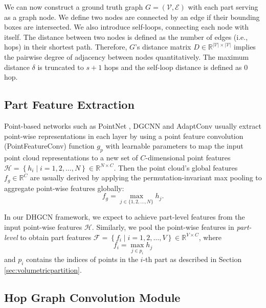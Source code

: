 \documentclass[letterpaper]{article} %
\begin{document}
We can now construct a ground truth graph \(G=(\mathcal{V}, \mathcal{E})\) with each part serving as a graph node.
We define two nodes are connected by an edge if their bounding boxes are intersected.
We also introduce self-loops, connecting each node with itself.
The distance between two nodes is defined as the number of edges (i.e., hops) in their shortest path.
Therefore, \(G\)'s distance matrix \(D \in \mathbb{R}^{|\mathcal{V}| \times |\mathcal{V}|}\) implies the pairwise degree of adjacency between nodes quantitatively.
The maximum distance \(\delta\) is truncated to \(s+1\) hops and the self-loop distance is defined as 0 hop.

\subsection{Part Feature Extraction}
\label{sec:partfeatureextractor}
Point-based networks such as PointNet \cite{qi2017pointnet}, DGCNN \cite{dgcnn} and AdaptConv \cite{adaptconv} usually extract point-wise representations in each layer by using a point feature convolution (PointFeatureConv) function \(g_p\) with learnable parameters to map the input point cloud representations to a new set of \(C\)-dimensional point features \(\mathcal{H}=\left\{h_{i} \mid i=1,2, \ldots, N\right\} \in \mathbb{R}^{N \times C}\).
Then the point cloud's global features \(f_g \in \mathbb{R}^C\) are usually derived by applying the permutation-invariant max pooling to aggregate point-wise features globally:
\begin{equation}
    f_{g} = \max  _{j \in  \{1,2,\dots,N\} } h_j.
\end{equation}

In our DHGCN framework, we expect to achieve part-level features from the input point-wise features \(\mathcal{H}\). %
Similarly, we pool the point-wise features in \textit{part-level} to obtain part features \(\mathcal{F}=\left\{f_{i} \mid i=1,2, \ldots, V\right\} \in \mathbb{R}^{V \times C}\), where
\begin{equation}
    f_{i} = \max  _{j \in p_i} h_j
\end{equation}
and \(p_i\) contains the indices of points in the \(i\)-th part as described in Section \ref{sec:volumetricpartition}.


\subsection{Hop Graph Convolution Module}
\label{sec:dynamichopconv}
\end{document}

